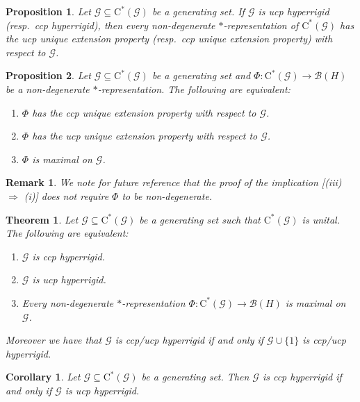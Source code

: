\documentclass[10pt,a4paper]{amsart}
\newtheorem{proposition}{Proposition}
\newtheorem{remark}{Remark}
\newtheorem{theorem}{Theorem}
\newtheorem{corollary}{Corollary}
\newcommand{\B}{{\mathcal{B}}}
\newcommand{\G}{{\mathcal{G}}}
\newcommand{\ca}{\mathrm{C}^*}
\begin{document}
\begin{proposition}\label{P:hypuep}
Let $\G \subseteq \ca(\G)$ be a generating set.
If $\G$ is ucp hyperrigid (resp.\ ccp hyperrigid), then every non-degenerate $*$-representation of $\ca(\G)$ has the ucp unique extension property (resp.\ ccp unique extension property) with respect to $\G$.
\end{proposition}

\begin{proposition}\label{P:uepiffmax}
Let $\G\subseteq \ca(\G)$ be a generating set and $\Phi \colon \ca(\G) \to \B(H)$ be a non-degenerate $*$-representation. 
The following are equivalent:
\begin{enumerate}
\item $\Phi$ has the ccp unique extension property with respect to $\G$.
\item $\Phi$ has the ucp unique extension property with respect to $\G$.
\item $\Phi$ is maximal on $\G$.
\end{enumerate}
\end{proposition}

\begin{remark}\label{R:uepiffmax}
We note for future reference that the proof of the implication [(iii) $\Rightarrow$ (i)] does not require $\Phi$ to be non-degenerate.
\end{remark}

\begin{theorem}\label{T:hypiffmaxun}
Let $\G \subseteq \ca(\G)$ be a generating set such that $\ca(\G)$ is unital.
The following are equivalent:
\begin{enumerate}
\item $\G$ is ccp hyperrigid.
\item $\G$ is ucp hyperrigid.
\item Every non-degenerate $*$-representation $\Phi \colon \ca(\G) \to \B(H)$ is maximal on $\G$.
\end{enumerate}
Moreover we have that $\G$ is ccp/ucp hyperrigid if and only if $\G \cup \{1\}$ is ccp/ucp hyperrigid.
\end{theorem}

\begin{corollary}\label{C:ccp/ucp}
Let $\G\subseteq\ca(\G)$ be a generating set.
Then $\G$ is ccp hyperrigid if and only if $\G$ is ucp hyperrigid.
\end{corollary}
\end{document}

